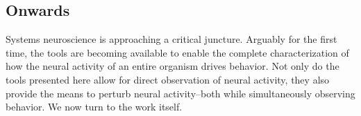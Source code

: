 


\subsection{Onwards}
Systems neuroscience is approaching  a critical juncture. Arguably for the first time, the tools are becoming available to enable the  complete characterization of how the neural activity of an entire organism drives  behavior. Not only  do the tools presented here allow for direct observation of neural activity,  they also provide the means to perturb neural activity--both while simultaneously observing behavior. We now turn to the work itself.


